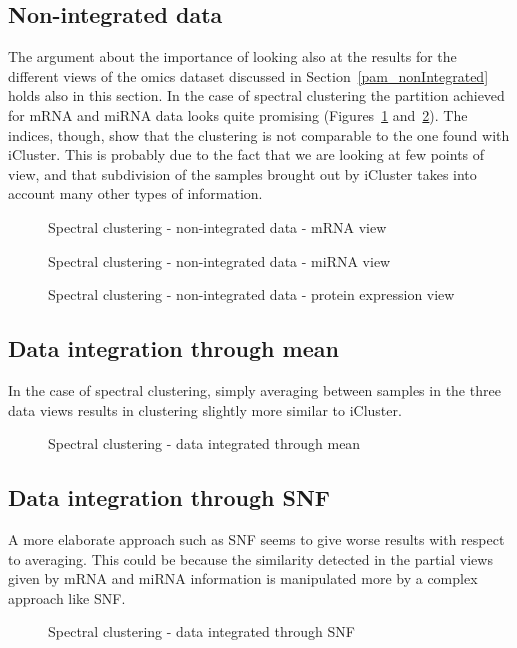 \subsection*{Non-integrated data}\label{sc_nonIntegrated}
The argument about the importance of looking also at the results for the different views of the omics dataset discussed in Section~\ref{pam_nonIntegrated} holds also in this section. In the case of spectral clustering the partition achieved for mRNA and miRNA data looks quite promising (Figures~\ref{fig:sc_1} and~\ref{fig:sc_2}). The indices, though, show that the clustering is not comparable to the one found with iCluster. This is probably due to the fact that we are looking at few points of view, and that subdivision of the samples brought out by iCluster takes into account many other types of information.
\begin{figure}[!]
    \centering
    \caption{Spectral clustering - non-integrated data - mRNA view}
    \label{fig:sc_1}
\end{figure}
\begin{figure}[!]
    \centering
    \caption{Spectral clustering - non-integrated data - miRNA view}
    \label{fig:sc_2}
\end{figure}
\begin{figure}[!]
    \centering
    \caption{Spectral clustering - non-integrated data - protein expression view}
    \label{fig:sc_3}
\end{figure}

\subsection*{Data integration through mean}\label{sc_mean}
In the case of spectral clustering, simply averaging between samples in the three data views results in clustering slightly more similar to iCluster.
\begin{figure}[!]
    \centering
    \caption{Spectral clustering - data integrated through mean}
    \label{fig:sc_mean}
\end{figure}

\subsection*{Data integration through SNF}\label{sc_SNF}
A more elaborate approach such as SNF seems to give worse results with respect to averaging. This could be because the similarity detected in the partial views given by mRNA and miRNA information is manipulated more by a complex approach like SNF.
\begin{figure}[!]
    \centering
    \caption{Spectral clustering - data integrated through SNF}
    \label{fig:sc_SNF}
\end{figure}
